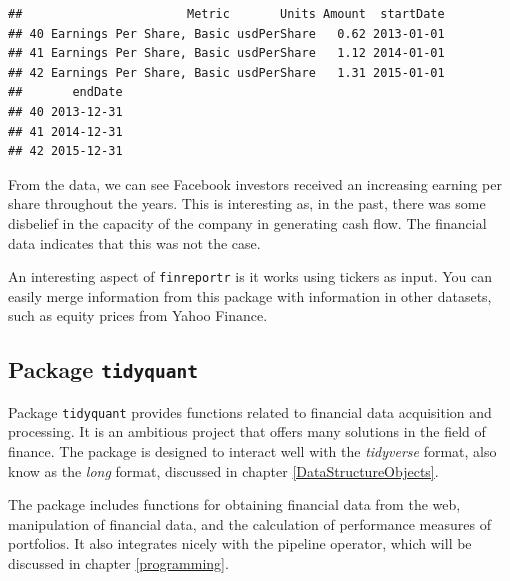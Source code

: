 \documentclass[11pt,]{book}
\newenvironment{Shaded}{\begin{snugshade}}{\end{snugshade}}
\newcommand{\KeywordTok}[1]{\textcolor[rgb]{0.27,0.27,0.27}{\textbf{#1}}}
\newcommand{\StringTok}[1]{\textcolor[rgb]{0.5,0.5,0.5}{#1}}
\newcommand{\CommentTok}[1]{\textcolor[rgb]{0.56,0.35,0.01}{\textit{#1}}}
\newcommand{\OperatorTok}[1]{\textcolor[rgb]{0.81,0.36,0.00}{\textbf{#1}}}
\newcommand{\NormalTok}[1]{#1}
\begin{document}
\begin{Shaded}
\end{Shaded}

\begin{verbatim}
##                       Metric       Units Amount  startDate
## 40 Earnings Per Share, Basic usdPerShare   0.62 2013-01-01
## 41 Earnings Per Share, Basic usdPerShare   1.12 2014-01-01
## 42 Earnings Per Share, Basic usdPerShare   1.31 2015-01-01
##       endDate
## 40 2013-12-31
## 41 2014-12-31
## 42 2015-12-31
\end{verbatim}

From the data, we can see Facebook investors received an increasing
earning per share throughout the years. This is interesting as, in the
past, there was some disbelief in the capacity of the company in
generating cash flow. The financial data indicates that this was not the
case.

An interesting aspect of \texttt{finreportr} is it works using tickers
as input. You can easily merge information from this package with
information in other datasets, such as equity prices from Yahoo Finance.

\subsection{\texorpdfstring{Package
\texttt{tidyquant}}{Package tidyquant}}\label{package-tidyquant}

Package \texttt{tidyquant} provides functions related to financial data
acquisition and processing. It is an ambitious project that offers many
solutions in the field of finance. The package is designed to interact
well with the \emph{tidyverse} format, also know as the \emph{long}
format, discussed in chapter \ref{DataStructureObjects}.

The package includes functions for obtaining financial data from the
web, manipulation of financial data, and the calculation of performance
measures of portfolios. It also integrates nicely with the pipeline
operator, which will be discussed in chapter \ref{programming}.
\end{document}
